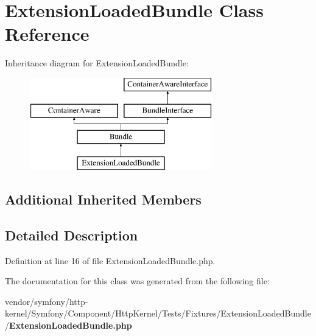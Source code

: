 \section{Extension\+Loaded\+Bundle Class Reference}
\label{class_symfony_1_1_component_1_1_http_kernel_1_1_tests_1_1_fixtures_1_1_extension_loaded_bundle_1_1_extension_loaded_bundle}
Inheritance diagram for Extension\+Loaded\+Bundle\+:\begin{figure}[H]
\begin{center}
\leavevmode
\includegraphics[height=4.000000cm]{class_symfony_1_1_component_1_1_http_kernel_1_1_tests_1_1_fixtures_1_1_extension_loaded_bundle_1_1_extension_loaded_bundle}
\end{center}
\end{figure}
\subsection*{Additional Inherited Members}


\subsection{Detailed Description}


Definition at line 16 of file Extension\+Loaded\+Bundle.\+php.



The documentation for this class was generated from the following file\+:\begin{DoxyCompactItemize}
\item 
vendor/symfony/http-\/kernel/\+Symfony/\+Component/\+Http\+Kernel/\+Tests/\+Fixtures/\+Extension\+Loaded\+Bundle/{\bf Extension\+Loaded\+Bundle.\+php}\end{DoxyCompactItemize}

